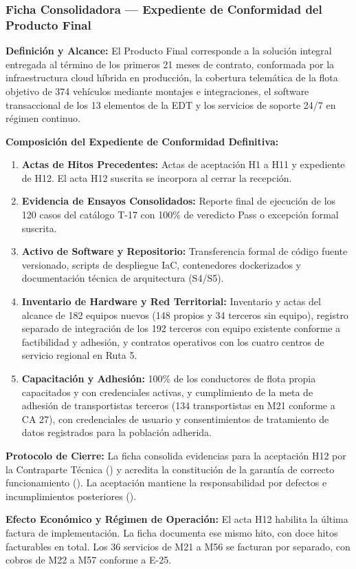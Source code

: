 \subsubsection*{Ficha Consolidadora — Expediente de Conformidad del Producto Final}\label{sec:9-proto-producto-final}
\par\noindent\textbf{Definición y Alcance:} El Producto Final corresponde a la solución integral entregada al término de los primeros 21 meses de contrato, conformada por la infraestructura cloud híbrida en producción, la cobertura telemática de la flota objetivo de 374 vehículos mediante montajes e integraciones, el software transaccional de los 13 elementos de la EDT y los servicios de soporte 24/7 en régimen continuo.\par
\par\noindent\textbf{Composición del Expediente de Conformidad Definitiva:}
\begin{enumerate}
  \item \textbf{Actas de Hitos Precedentes:} Actas de aceptación H1 a H11 y expediente de H12. El acta H12 suscrita se incorpora al cerrar la recepción.
  \item \textbf{Evidencia de Ensayos Consolidados:} Reporte final de ejecución de los 120 casos del catálogo T-17 con 100\% de veredicto Pass o excepción formal suscrita.
  \item \textbf{Activo de Software y Repositorio:} Transferencia formal de código fuente versionado, scripts de despliegue IaC, contenedores dockerizados y documentación técnica de arquitectura (S4/S5).
  \item \textbf{Inventario de Hardware y Red Territorial:} Inventario y actas del alcance de 182 equipos nuevos (148 propios y 34 terceros sin equipo), registro separado de integración de los 192 terceros con equipo existente conforme a factibilidad y adhesión, y contratos operativos con los cuatro centros de servicio regional en Ruta 5.
  \item \textbf{Capacitación y Adhesión:} 100\% de los conductores de flota propia capacitados y con credenciales activas, y cumplimiento de la meta de adhesión de transportistas terceros (134 transportistas en M21 conforme a CA 27), con credenciales de usuario y consentimientos de tratamiento de datos registrados para la población adherida.
\end{enumerate}
\par\noindent\textbf{Protocolo de Cierre:} La ficha consolida evidencias para la aceptación H12 por la Contraparte Técnica () y acredita la constitución de la garantía de correcto funcionamiento (). La aceptación mantiene la responsabilidad por defectos e incumplimientos posteriores ().\par
\par\noindent\textbf{Efecto Económico y Régimen de Operación:} El acta H12 habilita la última factura de implementación. La ficha documenta ese mismo hito, con doce hitos facturables en total. Los 36 servicios de M21 a M56 se facturan por separado, con cobros de M22 a M57 conforme a E-25.\par

